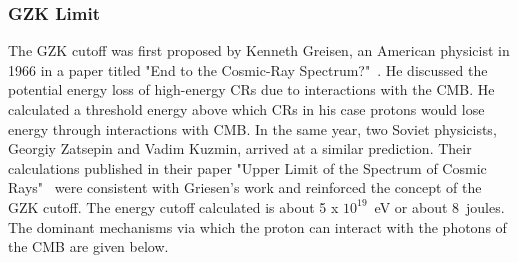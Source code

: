 \subsubsection{GZK Limit}
\label{subsubsec:GZK} 
The \gls{GZK} cutoff was first proposed by Kenneth Greisen, an American physicist in 1966 in a paper titled "End to the Cosmic-Ray Spectrum?"~\cite{PhysRevLett.16.748}. He discussed the potential energy loss of high-energy \glspl{CR} due to interactions with the CMB. He calculated a threshold energy above which \glspl{CR} in his case protons would lose energy through interactions with \gls{CMB}. In the same year, two Soviet physicists, Georgiy Zatsepin and Vadim Kuzmin, arrived at a similar prediction. Their calculations published in their paper "Upper Limit of the Spectrum of Cosmic Rays"~\cite{Zatsepin:1966jv} were consistent with Griesen's work and reinforced the concept of the \gls*{GZK} cutoff.  
The energy cutoff calculated is about 5 x $10^{19}$~\gls{eV} or about 8~joules. The dominant mechanisms via which the proton can interact with the photons of the \gls*{CMB} are given below. 

